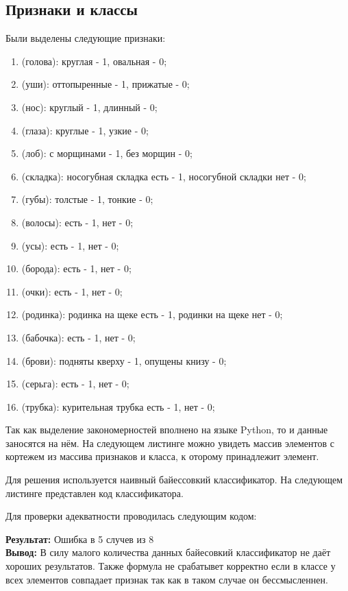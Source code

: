 \documentclass[a4paper, 12pt]{article}
\begin{document}
\subsection{Признаки и классы}
Были выделены следующие признаки:
\begin{enumerate}
  \item (голова): круглая - 1, овальная - 0;
  \item (уши): оттопыренные - 1, прижатые - 0;
  \item (нос): круглый - 1, длинный - 0;
  \item (глаза): круглые - 1, узкие - 0;
  \item (лоб): с морщинами - 1, без морщин - 0;
  \item (складка): носогубная складка есть - 1, носогубной складки нет - 0;
  \item (губы): толстые - 1, тонкие - 0;
  \item (волосы): есть - 1, нет - 0;
  \item (усы): есть - 1, нет - 0;
  \item (борода): есть - 1, нет - 0;
  \item (очки): есть - 1, нет - 0;
  \item (родинка): родинка на щеке есть - 1, родинки на щеке нет - 0;
  \item (бабочка): есть - 1, нет - 0;
  \item (брови): подняты кверху - 1, опущены книзу - 0;
  \item (серьга): есть - 1, нет - 0;
  \item (трубка): курительная трубка есть - 1, нет - 0;
\end{enumerate}
Так как выделение закономерностей вполнено на языке Python, то и данные заносятся на нём. На следующем листинге можно увидеть массив элементов с кортежем из массива признаков и класса, к оторому принадлежит элемент.

Для решения используется наивный байессовкий классификатор. На следующем листинге представлен код классификатора.

Для проверки адекватности проводилась следующим кодом:

\textbf{Результат:} Ошибка в 5 случев из 8 \\
\textbf{Вывод:} В силу малого количества данных байесовкий классификатор не даёт хороших результатов. Также формула не срабатывет корректно если в классе у всех элементов совпадает признак так как в таком случае он бессмысленнен.
\newpage
\end{document}
